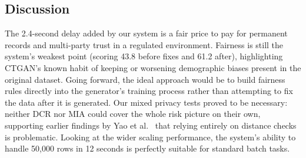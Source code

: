 \subsection{Discussion}

The 2.4-second delay added by our system is a fair price to pay for permanent records and multi-party trust in a regulated environment. Fairness is still the system's weakest point (scoring 43.8 before fixes and 61.2 after), highlighting CTGAN's known habit of keeping or worsening demographic biases present in the original dataset. Going forward, the ideal approach would be to build fairness rules directly into the generator's training process rather than attempting to fix the data after it is generated. Our mixed privacy tests proved to be necessary: neither DCR nor MIA could cover the whole risk picture on their own, supporting earlier findings by Yao et al.~\cite{yao2025dcr} that relying entirely on distance checks is problematic. Looking at the wider scaling performance, the system's ability to handle 50,000 rows in 12 seconds is perfectly suitable for standard batch tasks.
